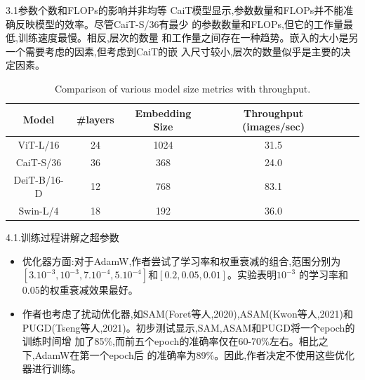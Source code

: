 \documentclass[UTF8]{ctexbeamer}
\begin{document}
\begin{frame}{3.1参数个数和FLOPs的影响并非均等}
  CaiT模型显示,参数数量和FLOPs并不能准确反映模型的效率。尽管CaiT-S/36有最少
  的参数数量和FLOPs,但它的工作量最低,训练速度最慢。相反,层次的数量
  和工作量之间存在一种趋势。嵌入的大小是另一个需要考虑的因素,但考虑到CaiT的嵌
  入尺寸较小,层次的数量似乎是主要的决定因素。
  \begin{table}[h]
    \centering
    \begin{tabular}{|c|c|c|c|c|c|}
    \hline
    Model & \#layers & Embedding Size & Throughput (images/sec)\\
    \hline
    ViT-L/16 & 24 & 1024  & 31.5 \\
    \hline
    CaiT-S/36 & 36 & 368  & 24.0 \\
    \hline
    DeiT-B/16-D & 12 & 768  & 83.1 \\
    \hline
    Swin-L/4 & 18 & 192  & 36.0 \\
    \hline
    \end{tabular}
    \caption{Comparison of various model size metrics with throughput.}
    \end{table}
\end{frame}

\begin{frame}{4.1.训练过程讲解之超参数}
  \begin{itemize}
    \item 优化器方面:对于AdamW,作者尝试了学习率和权重衰减的组合,范围分别为
    $[3.10^{-3}, 10^{-3}, 7.10^{-4}, 5.10^{-4}]$和$[0.2, 0.05, 0.01]$。实验表明$10^{-3}$
    的学习率和0.05的权重衰减效果最好。
    \item 作者也考虑了扰动优化器,如SAM(Foret等人,2020),ASAM(Kwon等人,2021)和
    PUGD(Tseng等人,2021)。初步测试显示,SAM,ASAM和PUGD将一个epoch的训练时间增
    加了85\%,而前五个epoch的准确率仅在60-70\%左右。相比之下,AdamW在第一个epoch后
    的准确率为89\%。因此,作者决定不使用这些优化器进行训练。
  \end{itemize}
\end{frame}
\end{document}
